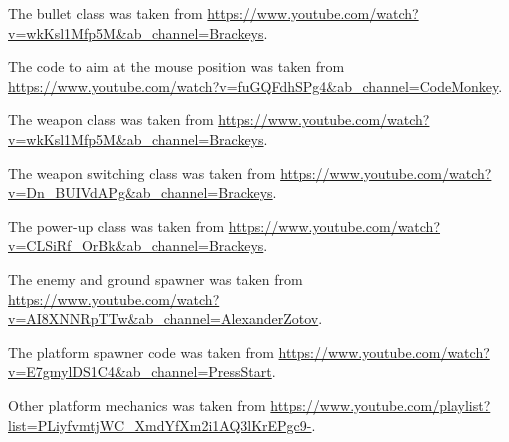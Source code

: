 \documentclass{article}
\begin{document}
The bullet class was taken from \url{https://www.youtube.com/watch?v=wkKsl1Mfp5M&ab_channel=Brackeys}.

The code to aim at the mouse position was taken from \url{https://www.youtube.com/watch?v=fuGQFdhSPg4&ab_channel=CodeMonkey}.

The weapon class was taken from \url{https://www.youtube.com/watch?v=wkKsl1Mfp5M&ab_channel=Brackeys}.

The weapon switching class was taken from \url{https://www.youtube.com/watch?v=Dn_BUIVdAPg&ab_channel=Brackeys}.

The power-up class was taken from \url{https://www.youtube.com/watch?v=CLSiRf_OrBk&ab_channel=Brackeys}.

The enemy and ground spawner was taken from \url{https://www.youtube.com/watch?v=AI8XNNRpTTw&ab_channel=AlexanderZotov}.

The platform spawner code was taken from \url{https://www.youtube.com/watch?v=E7gmylDS1C4&ab_channel=PressStart}.

Other platform mechanics was taken from \url{https://www.youtube.com/playlist?list=PLiyfvmtjWC_XmdYfXm2i1AQ3lKrEPgc9-}.


% 
% 
\end{document}
